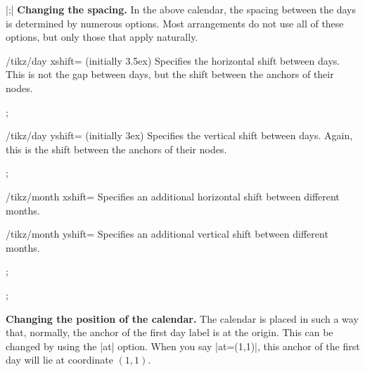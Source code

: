 \begin{command}{\calendar {}|;|}
    \medskip
    \textbf{Changing the spacing.}
    In the above calendar, the spacing between the days is determined by
    numerous options. Most arrangements do not use all of these options, but
    only those that apply naturally.
    \begin{key}{/tikz/day xshift= (initially 3.5ex)}
        Specifies the horizontal shift between days. This is not the gap
        between days, but the shift between the anchors of their nodes.
\begin{codeexample}[preamble={\usetikzlibrary{calendar}}]
\tikz \calendar[dates=2000-01-01 to 2000-01-31,week list,day xshift=3ex];
\end{codeexample}
    \end{key}
    \begin{key}{/tikz/day yshift= (initially 3ex)}
        Specifies the vertical shift between days. Again, this is the shift
        between the anchors of their nodes.
\begin{codeexample}[preamble={\usetikzlibrary{calendar}}]
\tikz \calendar[dates=2000-01-01 to 2000-01-31,week list,day yshift=2ex];
\end{codeexample}
    \end{key}
    \begin{key}{/tikz/month xshift=}
        Specifies an additional  horizontal shift between different months.
    \end{key}
    \begin{key}{/tikz/month yshift=}
        Specifies an additional  vertical shift between different months.
\begin{codeexample}[preamble={\usetikzlibrary{calendar}}]
\tikz \calendar[dates=2000-01-01 to 2000-02-last,week list,
                month yshift=0pt];
\end{codeexample}
\begin{codeexample}[preamble={\usetikzlibrary{calendar}}]
\tikz \calendar[dates=2000-01-01 to 2000-02-last,week list,
                month yshift=1cm];
\end{codeexample}
    \end{key}


    \medskip
    \textbf{Changing the position of the calendar.}
    The calendar is placed in such a way that, normally, the anchor of the
    first day label is at the origin. This can be changed by using the |at|
    option. When you say |at={(1,1)}|, this anchor of the first day will lie at
    coordinate $(1,1)$.


\end{command}
